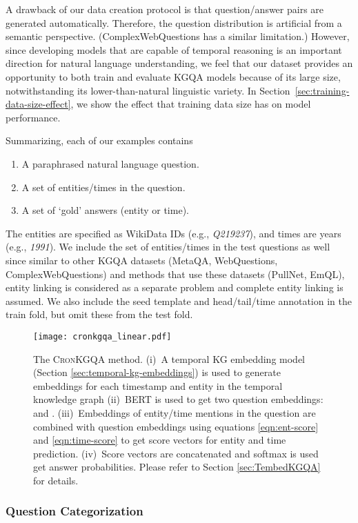 \documentclass[11pt,a4paper]{article}
\newcommand{\method}{\textsc{CronKGQA}}
\begin{document}
A drawback of our data creation protocol is that question/answer pairs are generated automatically.  Therefore, the question distribution is artificial from a semantic perspective.  (Complex\-Web\-Questions has a similar limitation.)  However, since developing models that are capable of temporal reasoning is an important direction for natural language understanding, we feel that our dataset provides an opportunity to both train and evaluate KGQA models because of its large size, notwithstanding its lower-than-natural linguistic variety. In Section~\ref{sec:training-data-size-effect}, we show the effect that training data size has on model performance.

Summarizing, each of our examples contains
\begin{enumerate}
    \item A paraphrased natural language question.
    \item A set of entities/times in the question.
    \item A set of `gold' answers (entity or time).
\end{enumerate}

The entities are specified as WikiData IDs (e.g., \textit{Q219237}), and times are years (e.g., \textit{1991}). We include the set of entities/times in the test questions as well since similar to other KGQA datasets (MetaQA, WebQuestions, ComplexWebQuestions) and methods that use these datasets (PullNet, EmQL), entity linking is considered as a separate problem and complete entity linking is assumed. We also include the seed template and head/tail/time annotation in the train fold, but omit these from the test fold.
\begin{figure*}
  \centering
  \texttt{[image: cronkgqa\_linear.pdf]}
  \caption{The \method{} method. (i)~A temporal KG embedding model (Section \ref{sec:temporal-kg-embeddings}) is used to generate embeddings for each timestamp and entity in the temporal knowledge graph (ii)~BERT is used to get two question embeddings:  and . (iii)~Embeddings of entity/time mentions in the question are combined with question embeddings using equations \ref{eqn:ent-score} and \ref{eqn:time-score} to get score vectors for entity and time prediction. (iv)~Score vectors are concatenated and softmax is used get answer probabilities. Please refer to Section \ref{sec:TembedKGQA} for details.}
  \label{fig:our-model}
\end{figure*}
\subsubsection{Question Categorization}
\label{sec:question-categorization}
\end{document}
